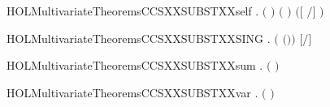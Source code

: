 \newcommand{\HOLMultivariateTheoremsCCSXXSUBSTXXrestr}{\UseVerbatim{HOLMultivariateTheoremsCCSXXSUBSTXXrestr}}
\begin{SaveVerbatim}{HOLMultivariateTheoremsCCSXXSUBSTXXself}
\HOLTokenTurnstile{} \HOLSymConst{\HOLTokenForall{}} .
         \HOLSymConst{\HOLTokenConj{}}  \ensuremath{(} \ensuremath{)} \ensuremath{(} \ensuremath{)} \HOLSymConst{\HOLTokenImp{}}
       \ensuremath{(}\ensuremath{[}  \ensuremath{/}\ensuremath{]}  \HOLSymConst{\ensuremath{=}} \ensuremath{)}
\end{SaveVerbatim}
\newcommand{\HOLMultivariateTheoremsCCSXXSUBSTXXself}{\UseVerbatim{HOLMultivariateTheoremsCCSXXSUBSTXXself}}
\begin{SaveVerbatim}{HOLMultivariateTheoremsCCSXXSUBSTXXSING}
\HOLTokenTurnstile{} \HOLSymConst{\HOLTokenForall{}}  .  \ensuremath{(} \HOLSymConst{|+} \ensuremath{(}\HOLSymConst{,}\ensuremath{)}\ensuremath{)}  \HOLSymConst{\ensuremath{=}} \ensuremath{[}\ensuremath{/}\ensuremath{]} 
\end{SaveVerbatim}
\newcommand{\HOLMultivariateTheoremsCCSXXSUBSTXXSING}{\UseVerbatim{HOLMultivariateTheoremsCCSXXSUBSTXXSING}}
\begin{SaveVerbatim}{HOLMultivariateTheoremsCCSXXSUBSTXXsum}
\HOLTokenTurnstile{} \HOLSymConst{\HOLTokenForall{}}  .
         \ensuremath{(} \HOLSymConst{\ensuremath{+}} \ensuremath{)} \HOLSymConst{\ensuremath{=}}
          \HOLSymConst{\ensuremath{+}}   
\end{SaveVerbatim}
\newcommand{\HOLMultivariateTheoremsCCSXXSUBSTXXsum}{\UseVerbatim{HOLMultivariateTheoremsCCSXXSUBSTXXsum}}
\begin{SaveVerbatim}{HOLMultivariateTheoremsCCSXXSUBSTXXvar}
\HOLTokenTurnstile{} \HOLSymConst{\HOLTokenForall{}} .
         \ensuremath{(} \ensuremath{)} \HOLSymConst{\ensuremath{=}}
         \HOLConst{\HOLTokenIn{}}         
\end{SaveVerbatim}
